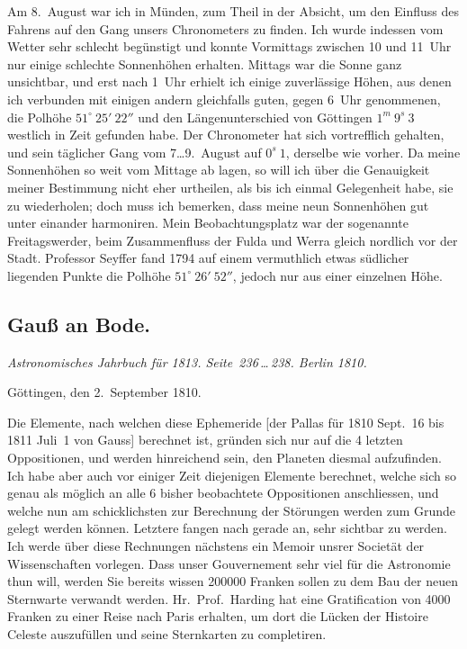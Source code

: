 \documentclass[12pt,a4paper]{book}
\begin{document}
Am 8.~August war ich in M\"unden, zum Theil in der Absicht, um den Einfluss des Fahrens auf den Gang unsers Chronometers zu finden. Ich wurde indessen vom Wetter sehr schlecht beg\"unstigt und konnte Vormittags zwischen 10 und 11~Uhr nur einige schlechte Sonnenh\"ohen erhalten. Mittags war die Sonne ganz unsichtbar, und erst nach 1~Uhr erhielt ich einige zuverl\"assige H\"ohen, aus denen ich verbunden mit einigen andern gleichfalls guten, gegen 6~Uhr genommenen, die Polh\"ohe $51^{\circ}\ 25'\ 22''$ und den L\"angenunterschied von G\"ottingen $1^{m}\ 9^{s}\ 3$ westlich in Zeit gefunden habe. Der Chronometer hat sich vortrefflich gehalten, und sein t\"aglicher Gang vom 7\ldots 9.~August auf $0^{s}\ 1$, derselbe wie vorher. Da meine Sonnenh\"ohen so weit vom Mittage ab lagen, so will ich \"uber die Genauigkeit meiner Bestimmung nicht eher urtheilen, als bis ich einmal Gelegenheit habe, sie zu wiederholen; doch muss ich bemerken, dass meine neun Sonnenh\"ohen gut unter einander harmoniren. Mein Beobachtungsplatz war der sogenannte Freitagswerder, beim Zusammenfluss der Fulda und Werra gleich nordlich vor der Stadt. Professor Seyffer fand 1794 auf einem vermuthlich etwas s\"udlicher liegenden Punkte die Polh\"ohe $51^{\circ}\ 26'\ 52''$, jedoch nur aus einer einzelnen H\"ohe.


\newpage
\subsection*{Gau{\ss} an Bode.}

\textit{Astronomisches Jahrbuch f\"ur 1813. Seite~236\,\ldots\,238. Berlin 1810.}

G\"ottingen, den 2.~September 1810.

Die Elemente, nach welchen diese Ephemeride [der Pallas f\"ur 1810 Sept.~16 bis 1811 Juli~1 von Gauss] berechnet ist, gr\"unden sich nur auf die 4 letzten Oppositionen, und werden hinreichend sein, den Planeten diesmal aufzufinden. Ich habe aber auch vor einiger Zeit diejenigen Elemente berechnet, welche sich so genau als m\"oglich an alle 6 bisher beobachtete Oppositionen anschliessen, und welche nun am schicklichsten zur Berechnung der St\"orungen werden zum Grunde gelegt werden k\"onnen. Letztere fangen nach gerade an, sehr sichtbar zu werden. Ich werde \"uber diese Rechnungen n\"achstens ein Memoir unsrer Societ\"at der Wissenschaften vorlegen. Dass unser Gouvernement sehr viel f\"ur die Astronomie thun will, werden Sie bereits wissen 200000 Franken sollen zu dem Bau der neuen Sternwarte verwandt werden. Hr.~Prof.~Harding hat eine Gratification von 4000 Franken zu einer Reise nach Paris erhalten, um dort die L\"ucken der Histoire Celeste auszuf\"ullen und seine Sternkarten zu completiren.
\end{document}
